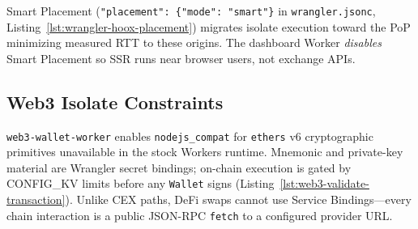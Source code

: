 Smart Placement (\texttt{"placement": \{"mode": "smart"\}} in \texttt{wrangler.jsonc}, Listing~\ref{lst:wrangler-hoox-placement}) migrates isolate execution toward the PoP minimizing measured RTT to these origins. The dashboard Worker \emph{disables} Smart Placement so SSR runs near browser users, not exchange APIs.

\subsection{Web3 Isolate Constraints}

\texttt{web3-wallet-worker} enables \texttt{nodejs\_compat} for \texttt{ethers} v6 cryptographic primitives unavailable in the stock Workers runtime. Mnemonic and private-key material are Wrangler secret bindings; on-chain execution is gated by CONFIG\_KV limits before any \texttt{Wallet} signs (Listing~\ref{lst:web3-validate-transaction}). Unlike CEX paths, DeFi swaps cannot use Service Bindings---every chain interaction is a public JSON-RPC \texttt{fetch} to a configured provider URL.